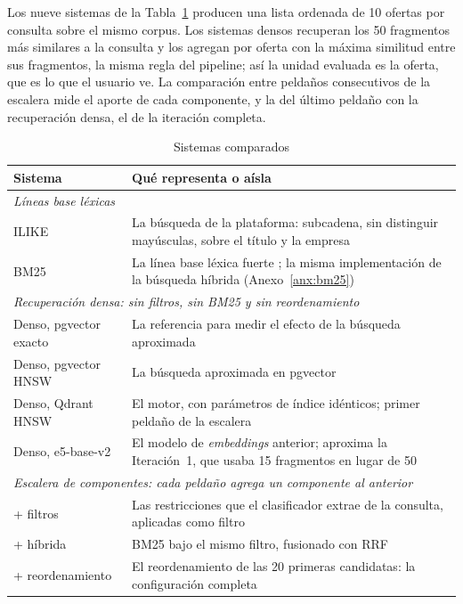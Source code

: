 Los nueve sistemas de la Tabla~\ref{tab:met-sistemas} producen una lista ordenada de 10 ofertas por consulta sobre el mismo corpus. Los sistemas densos recuperan los 50 fragmentos más similares a la consulta y los agregan por oferta con la máxima similitud entre sus fragmentos, la misma regla del pipeline; así la unidad evaluada es la oferta, que es lo que el usuario ve. La comparación entre peldaños consecutivos de la escalera mide el aporte de cada componente, y la del último peldaño con la recuperación densa, el de la iteración completa.

\begin{table}[!htb]
    \centering
    \caption{Sistemas comparados}
    \label{tab:met-sistemas}
    \small
    \begin{tabular}{|p{4.3cm}|p{9.9cm}|}
        \hline
        \textbf{Sistema} & \textbf{Qué representa o aísla} \\
        \hline
        \multicolumn{2}{|l|}{\textit{Líneas base léxicas}} \\
        \hline
        ILIKE & La búsqueda de la plataforma: subcadena, sin distinguir mayúsculas, sobre el título y la empresa \\
        \hline
        BM25 & La línea base léxica fuerte \citep{Robertson2009}; la misma implementación de la búsqueda híbrida (Anexo~\ref{anx:bm25}) \\
        \hline
        \multicolumn{2}{|l|}{\textit{Recuperación densa: sin filtros, sin BM25 y sin reordenamiento}} \\
        \hline
        Denso, pgvector exacto & La referencia para medir el efecto de la búsqueda aproximada \\
        \hline
        Denso, pgvector HNSW & La búsqueda aproximada en pgvector \\
        \hline
        Denso, Qdrant HNSW & El motor, con parámetros de índice idénticos; primer peldaño de la escalera \\
        \hline
        Denso, e5-base-v2 & El modelo de \textit{embeddings} anterior; aproxima la Iteración~1, que usaba 15 fragmentos en lugar de 50 \\
        \hline
        \multicolumn{2}{|l|}{\textit{Escalera de componentes: cada peldaño agrega un componente al anterior}} \\
        \hline
        + filtros & Las restricciones que el clasificador extrae de la consulta, aplicadas como filtro \\
        \hline
        + híbrida & BM25 bajo el mismo filtro, fusionado con RRF \\
        \hline
        + reordenamiento & El reordenamiento de las 20 primeras candidatas: la configuración completa \\
        \hline
    \end{tabular}
\end{table}

